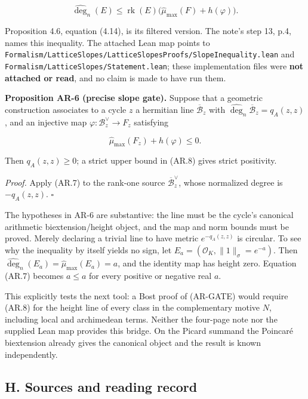 \documentclass[11pt,a4paper]{article}
\begin{document}
\[
\widehat{\deg}_{n}(E)
\le\operatorname{rk}(E)\bigl(\widehat\mu_{\max}(F)+h(\varphi)\bigr).
\tag{AR.7}
\]

Proposition 4.6, equation (4.14), is its filtered version. The note's
step 13, p.4, names this inequality. The attached Lean map points to
\texttt{Formalism/LatticeSlopes/LatticeSlopesProofs/SlopeInequality.lean}
and \texttt{Formalism/LatticeSlopes/Statement.lean}; these
implementation files were \textbf{not attached or read}, and no claim is
made to have run them.

\textbf{Proposition AR-6 (precise slope gate).} Suppose that a geometric
construction associates to a cycle \(z\) a hermitian line
\(\overline{\mathcal B}_z\) with
\(\widehat{\deg}_n\overline{\mathcal B}_z=q_A(z,z)\), and an injective
map \(\varphi:\mathcal B_z^\vee\to F_z\) satisfying

\[
\widehat\mu_{\max}(F_z)+h(\varphi)\le0.
\tag{AR.8}
\]

Then \(q_A(z,z)\ge0\); a strict upper bound in (AR.8) gives strict
positivity.

\emph{Proof.} Apply (AR.7) to the rank-one source
\(\overline{\mathcal B}_z^\vee\), whose normalized degree is
\(-q_A(z,z)\). \(\square\)

The hypotheses in AR-6 are substantive: the line must be the cycle's
canonical arithmetic biextension/height object, and the map and norm
bounds must be proved. Merely declaring a trivial line to have metric
\(e^{-q_A(z,z)}\) is circular. To see why the inequality by itself
yields no sign, let \(E_a=(\mathcal O_K,\|1\|_\sigma=e^{-a})\). Then
\(\widehat{\deg}_n(E_a)=\widehat\mu_{\max}(E_a)=a\), and the identity
map has height zero. Equation (AR.7) becomes \(a\le a\) for every
positive or negative real \(a\).

This explicitly tests the next tool: a Bost proof of (AR-GATE) would
require (AR.8) for the height line of every class in the complementary
motive \(N\), including local and archimedean terms. Neither the
four-page note nor the supplied Lean map provides this bridge. On the
Picard summand the Poincaré biextension already gives the canonical
object and the result is known independently.

\subsection{H. Sources and reading
record}\label{h.-sources-and-reading-record}
\end{document}
